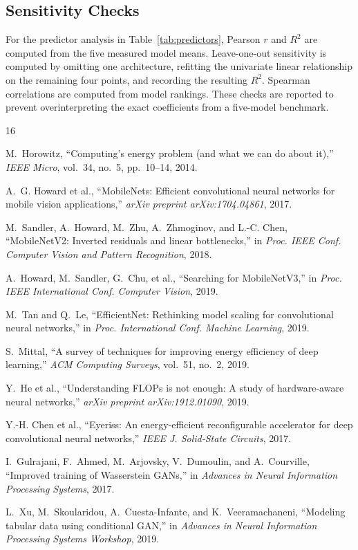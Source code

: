 \documentclass[conference]{IEEEtran}
\begin{document}
\subsection{Sensitivity Checks}
For the predictor analysis in Table~\ref{tab:predictors}, Pearson $r$ and
$R^2$ are computed from the five measured model means. Leave-one-out
sensitivity is computed by omitting one architecture, refitting the univariate
linear relationship on the remaining four points, and recording the resulting
$R^2$. Spearman correlations are computed from model rankings. These checks
are reported to prevent overinterpreting the exact coefficients from a
five-model benchmark.

\begin{thebibliography}{16}

M.~Horowitz, ``Computing's energy problem (and what we can do about it),''
\emph{IEEE Micro}, vol.~34, no.~5, pp.~10--14, 2014.

A.~G. Howard et al., ``MobileNets: Efficient convolutional neural networks for
mobile vision applications,'' \emph{arXiv preprint arXiv:1704.04861}, 2017.

M.~Sandler, A.~Howard, M.~Zhu, A.~Zhmoginov, and L.-C. Chen,
``MobileNetV2: Inverted residuals and linear bottlenecks,'' in
\emph{Proc. IEEE Conf. Computer Vision and Pattern Recognition}, 2018.

A.~Howard, M.~Sandler, G.~Chu, et al., ``Searching for MobileNetV3,'' in
\emph{Proc. IEEE International Conf. Computer Vision}, 2019.

M.~Tan and Q.~Le, ``EfficientNet: Rethinking model scaling for convolutional
neural networks,'' in \emph{Proc. International Conf. Machine Learning}, 2019.

S.~Mittal, ``A survey of techniques for improving energy efficiency of deep
learning,'' \emph{ACM Computing Surveys}, vol.~51, no.~2, 2019.

Y.~He et al., ``Understanding FLOPs is not enough: A study of hardware-aware
neural networks,'' \emph{arXiv preprint arXiv:1912.01090}, 2019.

Y.-H. Chen et al., ``Eyeriss: An energy-efficient reconfigurable accelerator
for deep convolutional neural networks,'' \emph{IEEE J. Solid-State Circuits},
2017.

I.~Gulrajani, F.~Ahmed, M.~Arjovsky, V.~Dumoulin, and A.~Courville,
``Improved training of Wasserstein GANs,'' in \emph{Advances in Neural
Information Processing Systems}, 2017.

L.~Xu, M.~Skoularidou, A.~Cuesta-Infante, and K.~Veeramachaneni, ``Modeling
tabular data using conditional GAN,'' in \emph{Advances in Neural Information
Processing Systems Workshop}, 2019.

\end{thebibliography}
\end{document}
